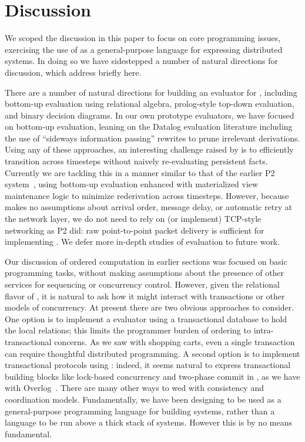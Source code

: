 \section{Discussion}
We scoped the discussion in this paper to focus on core programming issues, exercising the use of \lang as a general-purpose language for expressing distributed systems.  In doing so we have sidestepped a number of natural directions for discussion, which address briefly here.
    
There are a number of natural directions for building an evaluator for \lang, including bottom-up evaluation using relational algebra, prolog-style top-down evaluation, and binary decision diagrams.  In our own prototype evaluators, we have focused on bottom-up evaluation, leaning on the Datalog evaluation literature including the use of ``sideways information passing'' rewrites to prune irrelevant derivations.  Using any of these approaches, an interesting challenge raised by \lang is to efficiently transition across timesteps without naively re-evaluating persistent facts.  Currently we are tackling this in a manner similar to that of the earlier P2 system~\cite{cacm}, using bottom-up evaluation enhanced with materialized view maintenance logic to minimize rederivation across timesteps.  However, because \lang makes no assumptions about arrival order, message delay, or automatic retry at the network layer, we do not need to rely on (or implement) TCP-style networking as P2 did: raw point-to-point packet delivery is sufficient for implementing \lang.  We defer more in-depth studies of \lang evaluation to future work.

Our discussion of ordered computation in earlier sections was focused on basic programming tasks, without making assumptions about the presence of other services for sequencing or concurrency control.  However, given the relational flavor of \lang, it is natural to ask how it might interact with transactions or other models of concurrency.  At present there are two obvious approaches to consider.  One option is to implement a \lang evaluator using a transactional database to hold the local \lang relations; this limits the programmer burden of ordering to intra-transactional concerns.  As we saw with shopping carts, even a single transaction can require thoughtful distributed programming.  A second option is to implement transactional protocols using \lang: indeed, it seems natural to express transactional building blocks like lock-based concurrency and two-phase commit in \lang, as we have with Overlog~\cite{netdb}.  There are many other ways to wed \lang with consistency and coordination models.  Fundamentally, we have been designing \lang to be used as a general-purpose programming language for building systems, rather than a language to be run above a thick stack of systems.  However this is by no means fundamental.

